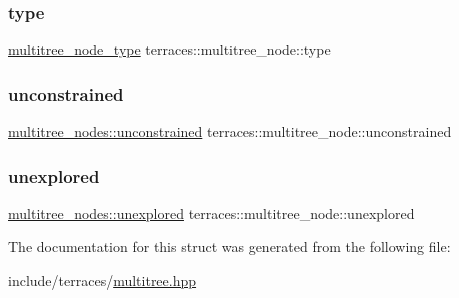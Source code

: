 \mbox{\label{structterraces_1_1multitree__node_a49438e92b6f5d03d2c4b80ca5c22e42b}} 
\subsubsection{\texorpdfstring{type}{type}}
{\footnotesize\ttfamily \hyperlink{namespaceterraces_ae1e4987c27eddd3b87041a2f0479bcc1}{multitree\+\_\+node\+\_\+type} terraces\+::multitree\+\_\+node\+::type}

\mbox{\label{structterraces_1_1multitree__node_a32b2c2ac8728878efc5d050f10e398e1}} 
\subsubsection{\texorpdfstring{unconstrained}{unconstrained}}
{\footnotesize\ttfamily \hyperlink{structterraces_1_1multitree__nodes_1_1unconstrained}{multitree\+\_\+nodes\+::unconstrained} terraces\+::multitree\+\_\+node\+::unconstrained}

\mbox{\label{structterraces_1_1multitree__node_a960b794604e1a306f8667fd021507a3b}} 
\subsubsection{\texorpdfstring{unexplored}{unexplored}}
{\footnotesize\ttfamily \hyperlink{structterraces_1_1multitree__nodes_1_1unexplored}{multitree\+\_\+nodes\+::unexplored} terraces\+::multitree\+\_\+node\+::unexplored}



The documentation for this struct was generated from the following file\+:\begin{DoxyCompactItemize}
\item 
include/terraces/\hyperlink{multitree_8hpp}{multitree.\+hpp}\end{DoxyCompactItemize}
